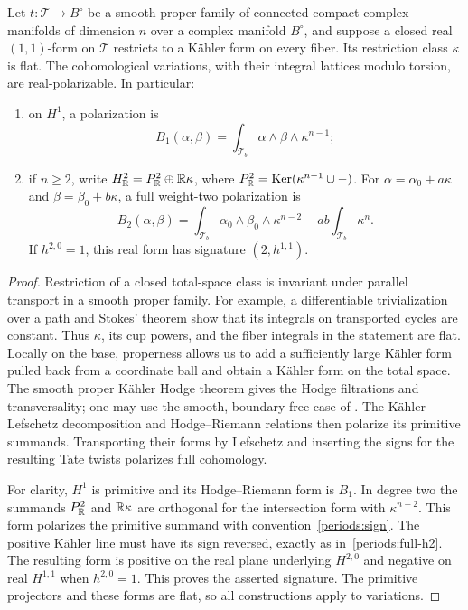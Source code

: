 \begin{lemma}
\label{periods:lefschetz}
Let $t:\mathcal T\to B^\circ$ be a smooth proper family of connected compact
complex manifolds of dimension $n$ over a complex manifold $B^\circ$,
and suppose a closed real $(1,1)$-form
on $\mathcal T$ restricts to a K\"ahler form on every fiber.  Its restriction
class $\kappa$ is flat.  The cohomological variations, with their integral
lattices modulo torsion, are real-polarizable.  In particular:
\begin{enumerate}[label=\textup{(\roman*)}]
\item on $H^1$, a polarization is
\[
 B_1(\alpha,\beta)=\int_{\mathcal T_b}
                  \alpha\wedge\beta\wedge\kappa^{n-1};
\]
\item if $n\geq2$, write
$H^2_{\mathbb R}=P^2_{\mathbb R}\oplus\mathbb R\kappa$, where
$P^2_{\mathbb R}=\operatorname{Ker}(\kappa^{n-1}\cup-)$.
For $\alpha=\alpha_0+a\kappa$ and $\beta=\beta_0+b\kappa$, a full
weight-two polarization is
\begin{equation}\label{periods:full-h2}
 B_2(\alpha,\beta)=
 \int_{\mathcal T_b}\alpha_0\wedge\beta_0\wedge\kappa^{n-2}
 -ab\int_{\mathcal T_b}\kappa^n.
\end{equation}
If $h^{2,0}=1$, this real form has signature $(2,h^{1,1})$.
\end{enumerate}
\end{lemma}

\begin{proof}
Restriction of a closed total-space class is invariant under parallel
transport in a smooth proper family.  For example, a differentiable
trivialization over a path and Stokes' theorem show that its integrals on
transported cycles are constant.  Thus $\kappa$, its cup powers, and the
fiber integrals in the statement are flat.  Locally on the base, properness
allows us to add a sufficiently large K\"ahler form pulled back from a
coordinate ball and obtain a K\"ahler form on the total space.  The smooth
proper K\"ahler Hodge
theorem gives the Hodge filtrations and transversality; one may use the
smooth, boundary-free case of \cite[Theorem~1.1]{FF25}.  The K\"ahler
Lefschetz decomposition and Hodge--Riemann relations then polarize its
primitive summands.  Transporting their forms by Lefschetz and inserting
the signs for the resulting Tate twists polarizes full cohomology.

For clarity, $H^1$ is primitive and its Hodge--Riemann form is $B_1$.
In degree two the summands $P^2_{\mathbb R}$ and $\mathbb R\kappa$ are orthogonal for the
intersection form with $\kappa^{n-2}$.  This form polarizes the primitive
summand with convention~\eqref{periods:sign}.  The positive K\"ahler line
must have its sign reversed, exactly as in~\eqref{periods:full-h2}.
The resulting form is positive on the real plane underlying $H^{2,0}$
and negative on real $H^{1,1}$ when $h^{2,0}=1$.  This proves the asserted
signature.  The primitive projectors and these forms are flat, so all
constructions apply to variations.
\end{proof}


